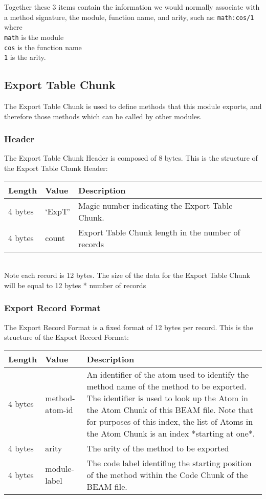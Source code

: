 \documentclass{article}
\begin{document}
Together these 3 items contain the information we would normally associate with a method signature, the module, function name, and arity, such as:
\texttt{math:cos/1} where\\
\texttt{math} is the module\\
\texttt{cos} is the function name\\
\texttt{1} is the arity.\\

\subsection{Export Table Chunk}
The Export Table Chunk is used to define methods that this module exports, and
therefore those methods which can be called by other modules.

\subsubsection{Header}
The Export Table Chunk Header is composed of 8 bytes.
This is the structure of the Export Table Chunk Header:\\
\begin{tabular}{ |l|l|p{3in}| } \hline
Length  & Value  & Description\\ \hline
4 bytes & `ExpT' & Magic number indicating the Export Table Chunk.\\ \hline
4 bytes & count & Export Table Chunk length in the number of records\\ \hline
\end{tabular}\\

Note each record is 12 bytes.  The size of the data for the Export Table Chunk will be equal to 12 bytes * number of records

\subsubsection{Export Record Format}
The Export Record Format is a fixed format of 12 bytes per record.
This is the structure of the Export Record Format:\\
\begin{tabular}{ |l|l|p{3in}| } \hline
Length  & Value  & Description\\ \hline
4 bytes & method-atom-id & An identifier of the atom used to identify the method name of the method to be exported.  The identifier is used to look up the Atom in the Atom Chunk of this BEAM file.  Note that for purposes of this index, the list of Atoms in the Atom Chunk is an index *starting at one*.\\ \hline
4 bytes & arity & The arity of the method to be exported\\ \hline
4 bytes & module-label & The code label identifing the starting position of the method within the Code Chunk of the BEAM file.\\ \hline
\end{tabular}\\
\end{document}
